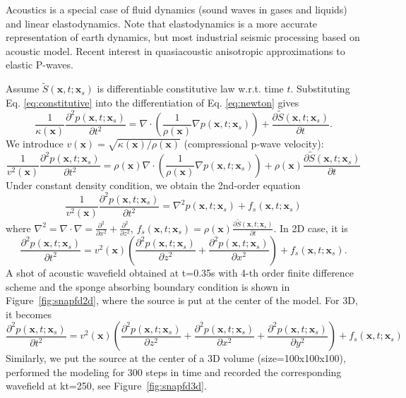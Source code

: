 Acoustics is a special case of fluid dynamics (sound waves in gases and liquids) and linear elastodynamics. Note that elastodynamics is a more accurate representation of earth dynamics, but most industrial seismic processing based on acoustic model. Recent interest in quasiacoustic anisotropic approximations to elastic P-waves.

Assume $\tilde{S}(\textbf{x},t;\textbf{x}_s)$ is differentiable constitutive law w.r.t. time $t$.
Substituting Eq. \eqref{eq:constitutive} into the differentiation of Eq. \eqref{eq:newton}  gives
\begin{equation}
\frac{1}{\kappa(\textbf{x})}\frac{\partial^2 p(\textbf{x},t;\textbf{x}_s)}{\partial t^2}
=\nabla\cdot \left(\frac{1}{\rho(\textbf{x})}\nabla p(\textbf{x},t; \textbf{x}_s)\right)
+\frac{\partial \tilde{S}(\textbf{x},t;\textbf{x}_s)}{\partial t}.
\end{equation}
We introduce $ v(\textbf{x})=\sqrt{\kappa(\textbf{x})/\rho(\textbf{x})} $ (compressional p-wave velocity):
\begin{equation}
\frac{1}{v^2(\textbf{x})}\frac{\partial^2 p(\textbf{x},t;\textbf{x}_s)}{\partial t^2}
=\rho(\textbf{x}) \nabla\cdot \left(\frac{1}{\rho(\textbf{x})}\nabla p(\textbf{x},t; \textbf{x}_s)\right)
+\rho(\textbf{x})\frac{\partial\tilde{S}(\textbf{x},t;\textbf{x}_s)}{\partial t}
\end{equation}
Under constant density condition, we obtain the 2nd-order equation
\begin{equation}\label{eq:scalar_wav}
\frac{1}{v^2(\textbf{x})}\frac{\partial^2 p(\textbf{x},t;\textbf{x}_s)}{\partial t^2}=\nabla^2 p(\textbf{x},t;\textbf{x}_s)+f_s(\textbf{x},t;\textbf{x}_s)
\end{equation}
where $\nabla^2=\nabla\cdot\nabla=\frac{\partial^2}{\partial x^2}+\frac{\partial^2}{\partial z^2}$, $f_s(\textbf{x},t;\textbf{x}_s)=\rho(\textbf{x})\frac{\partial\tilde{S}(\textbf{x},t;\textbf{x}_s)}{\partial t}$. In 2D case, it is
\begin{equation}
 \frac{\partial^2 p(\textbf{x},t;\textbf{x}_s)}{\partial t^2}
 =v^2(\textbf{x})\left(\frac{\partial^2 p(\textbf{x},t;\textbf{x}_s) }{\partial z^2} 
 +\frac{\partial^2 p(\textbf{x},t;\textbf{x}_s)}{\partial x^2}\right)+f_s(\textbf{x},t;\textbf{x}_s).
\end{equation}
A shot of acoustic wavefield obtained at t=0.35s with 4-th order finite difference scheme and the sponge absorbing boundary condition is shown in Figure~\ref{fig:snapfd2d}, where the source is put at the center of the model. For 3D, it becomes
\begin{equation}
 \frac{\partial^2 p(\textbf{x},t;\textbf{x}_s)}{\partial t^2}
 =v^2(\textbf{x})\left(\frac{\partial^2 p(\textbf{x},t;\textbf{x}_s) }{\partial z^2}  
 +\frac{\partial^2 p(\textbf{x},t;\textbf{x}_s)}{\partial x^2}
 +\frac{\partial^2 p(\textbf{x},t;\textbf{x}_s)}{\partial y^2}\right)+f_s(\textbf{x},t;\textbf{x}_s)
\end{equation}
Similarly, we put the source at the center of a 3D volume (size=100x100x100), performed the modeling for 300 steps in time and recorded the corresponding wavefield at kt=250, see Figure~\ref{fig:snapfd3d}.

